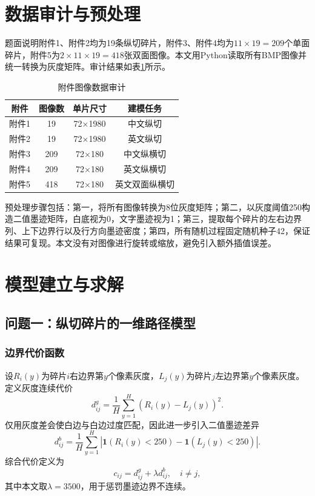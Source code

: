 \documentclass[UTF8,a4paper,12pt]{ctexart}
\begin{document}
\section{数据审计与预处理}
题面说明附件1、附件2均为19条纵切碎片，附件3、附件4均为$11\times19=209$个单面碎片，附件5为$2\times11\times19=418$张双面图像。本文用Python读取所有BMP图像并统一转换为灰度矩阵。审计结果如表\ref{tab:audit}所示。
\begin{table}[H]\centering\caption{附件图像数据审计}\label{tab:audit}\begin{tabular}{cccc}\toprule 附件&图像数&单片尺寸&建模任务\\\midrule
附件1&19&72×1980&中文纵切\\
附件2&19&72×1980&英文纵切\\
附件3&209&72×180&中文纵横切\\
附件4&209&72×180&英文纵横切\\
附件5&418&72×180&英文双面纵横切\\
\bottomrule\end{tabular}\end{table}

预处理步骤包括：第一，将所有图像转换为8位灰度矩阵；第二，以灰度阈值250构造二值墨迹矩阵，白底视为0，文字墨迹视为1；第三，提取每个碎片的左右边界列、上下边界行以及行方向墨迹密度；第四，所有随机过程固定随机种子42，保证结果可复现。本文没有对图像进行旋转或缩放，避免引入额外插值误差。

\section{模型建立与求解}
\subsection{问题一：纵切碎片的一维路径模型}
\subsubsection{边界代价函数}
设$R_i(y)$为碎片$i$右边界第$y$个像素灰度，$L_j(y)$为碎片$j$左边界第$y$个像素灰度。定义灰度连续代价
\begin{equation}d^g_{ij}=\frac1H\sum_{y=1}^H\left(R_i(y)-L_j(y)\right)^2.\end{equation}
仅用灰度差会使白边与白边过度匹配，因此进一步引入二值墨迹差异
\begin{equation}d^b_{ij}=\frac1H\sum_{y=1}^H\left|\mathbf 1(R_i(y)<250)-\mathbf 1(L_j(y)<250)\right|.\end{equation}
综合代价定义为
\begin{equation}c_{ij}=d^g_{ij}+\lambda d^b_{ij},\quad i\ne j,\end{equation}
其中本文取$\lambda=3500$，用于惩罚墨迹边界不连续。
\end{document}
